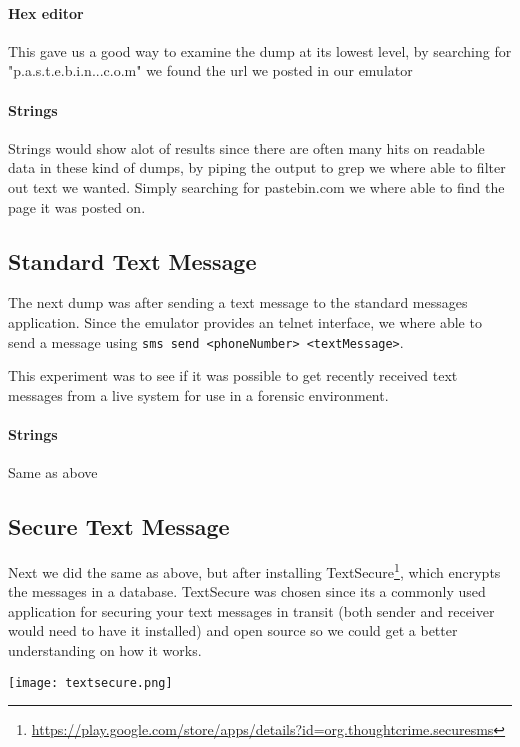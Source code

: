   \paragraph{Hex editor}
  This gave us a good way to examine the dump at its lowest level, by searching for 
  "p.a.s.t.e.b.i.n...c.o.m" we found the url we posted in our emulator

  \paragraph{Strings}
  Strings would show alot of results since there are often many hits on readable 
  data in these kind of dumps, by piping the output to grep we where able to 
  filter out text we wanted. Simply searching for pastebin.com we where able to 
  find the page it was posted on. 
  
  \subsection{Standard Text Message}
  The next dump was after sending a text message to the standard messages application. 
  Since the emulator provides an telnet interface, we where able to send a message 
  using \texttt{sms send <phoneNumber> <textMessage>}.
  
  This experiment was to see if it was possible to get recently received text 
  messages from a live system for use in a forensic environment.

  \paragraph{Strings}
  Same as above %
  \subsection{Secure Text Message}
  Next we did the same as above, but after installing 
  TextSecure\footnote{\url{https://play.google.com/store/apps/details?id=org.thoughtcrime.securesms}}, 
  which encrypts the messages in a database. TextSecure was chosen since its a commonly 
  used application for securing your text 
  messages in transit (both sender and receiver would need to have it installed) and open source 
  so we could get a better understanding 
  on how it works. 
  
  \texttt{[image: textsecure.png]}
  
